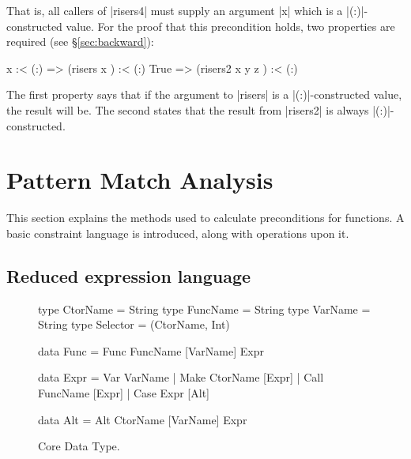 \noindent That is, all callers of |risers4| must supply an argument |x| which is a |(:)|-constructed value. For the proof that this precondition holds, two properties are required (see \S\ref{sec:backward}):

\ignore\begin{code}
x :< (:)  => (risers x       ) :< (:)
True      => (risers2 x y z  ) :< (:)
\end{code}

\noindent The first property says that if the argument to |risers| is a |(:)|-constructed value, the result will be. The second states that the result from |risers2| is always |(:)|-constructed.

\section{Pattern Match Analysis}
\label{sec:manipulate}

This section explains the methods used to calculate preconditions for functions. A basic constraint language is introduced, along with operations upon it.

\subsection{Reduced expression language}
\label{sec:core}

\begin{figure}
\begin{code}
type CtorName  =  String
type FuncName  =  String
type VarName   =  String
type Selector  =  (CtorName, Int)

data Func  =  Func FuncName [VarName] Expr

data Expr  =  Var   VarName
           |  Make  CtorName  [Expr]
           |  Call  FuncName  [Expr]
           |  Case  Expr      [Alt]

data Alt   =  Alt CtorName [VarName] Expr
\end{code}
\caption{Core Data Type.}
\label{fig:core}
\figureend
\end{figure}

